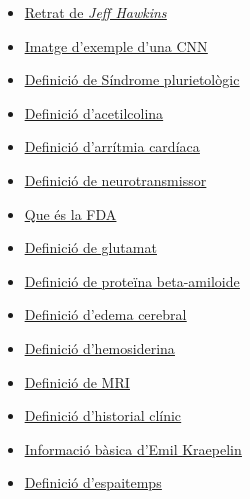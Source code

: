 \documentclass[a4paper,12pt]{article}
\begin{document}
\begin{itemize}
    \item \href{https://m.media-amazon.com/images/S/amzn-author-media-prod/b2a43a485uokuohjp5l7peo9f0._SX450_.jpg}{\underline{Retrat de \textit{Jeff Hawkins}}}
    \item \href{https://editor.analyticsvidhya.com/uploads/25366Convolutional_Neural_Network_to_identify_the_image_of_a_bird.png}{\underline{Imatge d'exemple d'una CNN}}
    \item \href{https://es.wikipedia.org/wiki/Síndrome}{\underline{ Definició de Síndrome plurietològic}}
    \item \href{https://www.cancer.gov/espanol/publicaciones/diccionarios/diccionario-cancer/def/acetilcolina}{\underline{Definició d'acetilcolina}}
    \item \href{https://medlineplus.gov/spanish/ency/article/001101.htm#:~:text=Es%20un%20trastorno%20de%20la,peligro%20inmediato%20para%20su%20salud.}{\underline{Definició d'arrítmia cardíaca}}
    \item \href{https://www.kenhub.com/es/library/anatomia-es/neurotransmisores}{\underline{Definició de neurotransmissor}}
    \item \href{https://www.ambit-bst.com/blog/qué-es-la-fda-y-cuáles-son-sus-funciones}{\underline{Que és la FDA}}
    \item \href{https://www.mentta.com/blog/que-es-el-glutamato/#:~:text=¿Qué%20es%20el%20glutamato%3F,partir%20de%20procesos%20de%20fermentación.}{\underline{Definició de glutamat}}
    \item \href{https://www.quimica.es/enciclopedia/Beta-amiloide.html}{\underline{Definició de proteïna beta-amiloide}}
    \item \href{https://bluenethospitals.com/health-library/edema-cerebral#:~:text=El%20Edema%20Cerebral%20se%20presenta,causando%20dolor%20en%20el%20paciente.}{\underline{Definició d'edema cerebral}}
    \item \href{http://www.neurocirugiacontemporanea.com/doku.php?id=hemosiderina}{\underline{Definició d'hemosiderina}}
    \item \href{https://www.nibib.nih.gov/science-education/science-topics/magnetic-resonance-imaging-mri}{\underline{Definició de MRI}}
    \item \href{https://www.igaleno.com/blog/que-es-historia-clinica/}{\underline{Definició d'historial clínic}}
    \item \href{https://www.ncbi.nlm.nih.gov/pmc/articles/PMC2927892/}{\underline{Informació bàsica d'Emil Kraepelin}}
    \item \href{https://ca.wikipedia.org/wiki/Espaitemps}{\underline{Definició d'espaitemps}}

\end{itemize}
\end{document}
